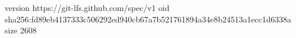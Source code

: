 version https://git-lfs.github.com/spec/v1
oid sha256:fd89eb4137333c506292ed940cb67a7b521761894a34e8b24513a1ecc1d6338a
size 2608
